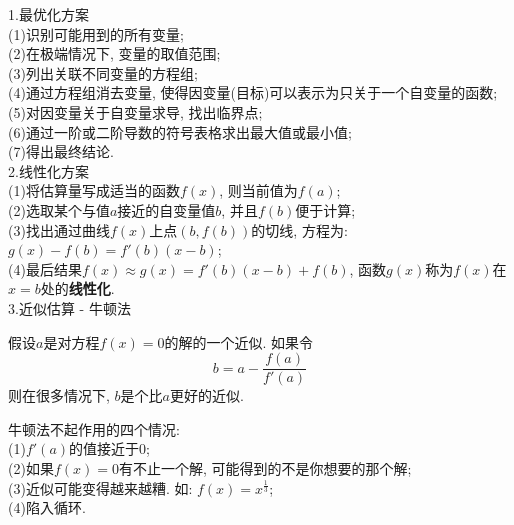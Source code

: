 \documentclass[UTF8, fontset=ubuntu]{ctexart}
\theoremstyle{empty}
\begin{document}
1.最优化方案\\
(1)识别可能用到的所有变量;\\
(2)在极端情况下, 变量的取值范围;\\
(3)列出关联不同变量的方程组;\\
(4)通过方程组消去变量, 使得因变量(目标)可以表示为只关于一个自变量的函数;\\
(5)对因变量关于自变量求导, 找出临界点;\\
(6)通过一阶或二阶导数的符号表格求出最大值或最小值;\\
(7)得出最终结论.\\[2ex]

2.线性化方案\\
(1)将估算量写成适当的函数$f(x)$, 则当前值为$f(a)$;\\
(2)选取某个与值$a$接近的自变量值$b$, 并且$f(b)$便于计算;\\
(3)找出通过曲线$f(x)$上点$(b,f(b))$的切线, 方程为: $g(x)-f(b)=f'(b)(x-b)$;\\
(4)最后结果$f(x)\approx g(x)=f'(b)(x-b)+f(b)$, 函数$g(x)$称为$f(x)$在$x=b$处的\textbf{线性化}.\\[2ex]

3.近似估算 - 牛顿法\\[-4ex]
\begin{theorem}[牛顿法]
假设$a$是对方程$f(x)=0$的解的一个近似. 如果令
\[b=a-\frac{f(a)}{f'(a)}\]
则在很多情况下, $b$是个比$a$更好的近似.
\end{theorem}
牛顿法不起作用的四个情况:\\
(1)$f'(a)$的值接近于$0$;\\
(2)如果$f(x)=0$有不止一个解, 可能得到的不是你想要的那个解;\\
(3)近似可能变得越来越糟. 如: $f(x)=x^{\frac{1}{3}}$;\\
(4)陷入循环.\\
\end{document}
